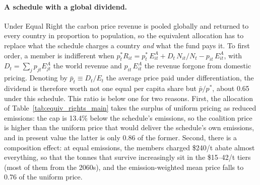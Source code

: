 \documentclass[12pt,english]{article}
\theoremstyle{remark}
\begin{document}
\paragraph{A schedule with a global dividend.} Under Equal Right the carbon price revenue is pooled globally and returned to every country in proportion to population, so the equivalent allocation has to replace what the schedule charges a country \emph{and} what the fund pays it. To first order, a member is indifferent when $p^*_t R_{it} = p^*_t\,E^A_{it} + D_t\,N_{it}/N_t - p_{it}\,E^A_{it}$, with $D_t=\sum_j p_{jt}E^A_{jt}$ the world revenue and $p_{it}\,E^A_{it}$ the revenue forgone from domestic pricing. %
Denoting by $\bar p_t \equiv D_t/E_t$ the average price paid under differentiation, the dividend is therefore worth not one equal per capita share but $\bar p/p^*$, about 0.65 under this schedule. This ratio is below one for two reasons. First, the allocation of Table~\ref{tab:equiv_rights_main} takes the surplus of uniform pricing as reduced emissions: the cap is 13.4\% below the schedule's emissions, so the coalition price is higher than the uniform price that would deliver the schedule's own emissions, %
and in present value the latter is only 0.86 of the former. Second, there is a composition effect: at equal emissions, the members charged \$240/t abate almost everything, so that the tonnes that survive increasingly sit in the \$15--42/t tiers (most of them from the 2060s), and the emission-weighted mean price falls to 0.76 of the uniform price. %
\end{document}
